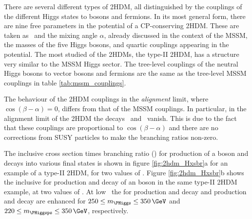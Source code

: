 There are several different types of \ac{2HDM}, all distinguished by the couplings
of the different Higgs states to bosons and fermions. In its most general
form, there are nine free parameters in the potential of a CP-conserving 2HDM. 
These are taken as \tanb~and the mixing angle $\alpha$, already discussed in 
the context of the \ac{MSSM}, the masses of the five Higgs bosons,
and quartic couplings appearing in the potential. The most studied of the
\ac{2HDM}s, the type-II \ac{2HDM}, has a structure very similar to 
the MSSM Higgs sector. The tree-level couplings of the neutral Higgs bosons to 
vector bosons and fermions are the same as the tree-level \ac{MSSM} couplings 
in table \ref{tab:mssm_couplings}. %

The behaviour of the \ac{2HDM} couplings in the \textit{alignment} limit,
where $\cos{(\beta-\alpha)} = 0$, differs from that of the \ac{MSSM} couplings.
In particular, in the alignment limit of the \ac{2HDM} the decays \AtoZh~and \Htohh~vanish.
This is due to the fact that these couplings are
proportional to $\cos{(\beta-\alpha)}$ and there are no corrections
from \ac{SUSY} particles to make the branching ratios non-zero.

The inclusive cross section times branching ratio (\xsbr) for production of a \PHiggs boson 
and decays into various final states is shown in figure \ref{fig:2hdm_Hxsbr}a for an 
example of a type-II \ac{2HDM}, for two values of \tanb. Figure \ref{fig:2hdm_Hxsbr}b 
shows the inclusive \xsbr for production and decay
of an \PHiggsps boson in the same type-II \ac{2HDM} example, at two values of \tanb. At
low \tanb~the \xsbr for \Htohh production and decay and \AtoZh production
and decay are enhanced for $250\leq m_{\PHiggs}\leq 350\,\GeV$ and $220 \leq m_{\PHiggsps} \leq 350\,\GeV$, respectively.

